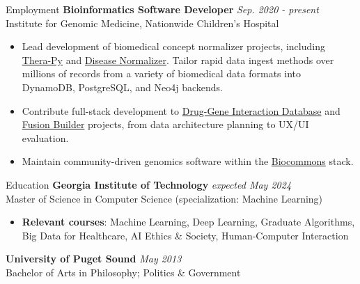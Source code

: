 \documentclass{cv} %
\begin{document}
\begin{rSection}{Employment}
{\bf Bioinformatics Software Developer} \hfill {\em Sep. 2020 - present}\\
Institute for Genomic Medicine, Nationwide Children's Hospital
\begin{itemize}[leftmargin=*]
    \item Lead development of biomedical concept normalizer projects, including \href{https://github.com/cancervariants/therapy-normalization}{Thera-Py} and \href{https://github.com/cancervariants/disease-normalization}{Disease Normalizer}. Tailor rapid data ingest methods over millions of records from a variety of biomedical data formats into DynamoDB, PostgreSQL, and Neo4j backends.
    \item Contribute full-stack development to \href{https://dgidb.org}{Drug-Gene Interaction Database} and \href{http://fusion-builder.cancervariants.org/}{Fusion Builder} projects, from data architecture planning to UX/UI evaluation.
    \item Maintain community-driven genomics software within the \href{https://biocommons.org/en/latest/}{Biocommons} stack.
\end{itemize}
\end{rSection}


\begin{rSection}{Education}
{\bf Georgia Institute of Technology} \hfill {\em expected May 2024}\\
Master of Science in Computer Science (specialization: Machine Learning)
\begin{itemize}[leftmargin=*]
    \item \small{\textbf{Relevant courses}: Machine Learning, Deep Learning, Graduate Algorithms, Big Data for Healthcare, AI Ethics \& Society, Human-Computer Interaction}
\end{itemize}

{\bf University of Puget Sound} \hfill {\em May 2013}\\
Bachelor of Arts in Philosophy; Politics \& Government
\end{rSection}
\end{document}
